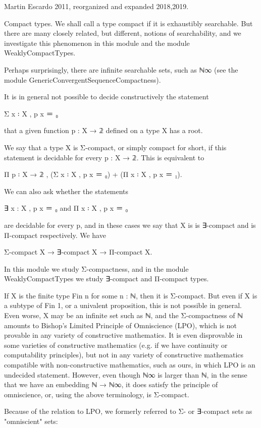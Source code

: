 Martin Escardo 2011, reorganized and expanded 2018,2019.

Compact types. We shall call a type compact if it is exhaustibly
searchable. But there are many closely related, but different, notions
of searchability, and we investigate this phenomenon in this module
and the module WeaklyCompactTypes.

Perhaps surprisingly, there are infinite searchable sets, such as ℕ∞
(see the module GenericConvergentSequenceCompactness).

It is in general not possible to decide constructively the statement

  Σ x ꞉ X , p x ＝ ₀

that a given function p : X → 𝟚 defined on a type X has a root.

We say that a type X is Σ-compact, or simply compact for short, if
this statement is decidable for every p : X → 𝟚. This is equivalent to

  Π p ꞉ X → 𝟚 , (Σ x ꞉ X , p x ＝ ₀) + (Π x ꞉ X , p x ＝ ₁).

We can also ask whether the statements

  ∃ x : X , p x ＝ ₀   and   Π x ꞉ X , p x ＝ ₀

are decidable for every p, and in these cases we say that X is
is ∃-compact and is Π-compact respectively. We have

  Σ-compact X → ∃-compact X → Π-compact X.

In this module we study Σ-compactness, and in the module
WeaklyCompactTypes we study ∃-compact and Π-compact types.

If X is the finite type Fin n for some n : ℕ, then it is
Σ-compact. But even if X is a subtype of Fin 1, or a univalent
proposition, this is not possible in general. Even worse, X may be an
infinite set such as ℕ, and the Σ-compactness of ℕ amounts to Bishop's
Limited Principle of Omniscience (LPO), which is not provable in any
variety of constructive mathematics. It is even disprovable in some
varieties of constructive mathematics (e.g. if we have continuity or
computability principles), but not in any variety of constructive
mathematics compatible with non-constructive mathematics, such as
ours, in which LPO is an undecided statement. However, even though ℕ∞
is larger than ℕ, in the sense that we have an embedding ℕ → ℕ∞, it
does satisfy the principle of omniscience, or, using the above
terminology, is Σ-compact.

Because of the relation to LPO, we formerly referred to Σ- or
∃-compact sets as "omniscient" sets:

